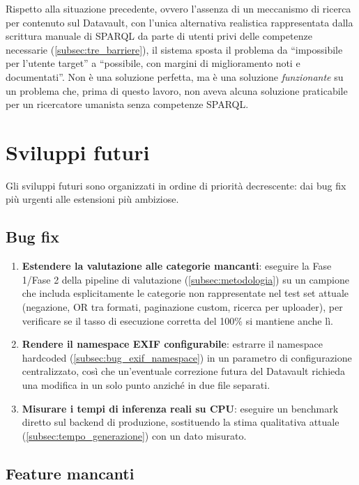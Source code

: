 \documentclass[12pt,a4paper,oneside]{book}
\begin{document}
Rispetto alla situazione precedente, ovvero l'assenza di un meccanismo di ricerca per contenuto sul Datavault, con l'unica alternativa realistica rappresentata dalla scrittura manuale di SPARQL da parte di utenti privi delle competenze necessarie (\cref{subsec:tre_barriere}), il sistema sposta il problema da ``impossibile per l'utente target'' a ``possibile, con margini di miglioramento noti e documentati''. Non è una soluzione perfetta, ma è una soluzione \emph{funzionante} su un problema che, prima di questo lavoro, non aveva alcuna soluzione praticabile per un ricercatore umanista senza competenze SPARQL.\@



\section{Sviluppi futuri}\label{sec:sviluppi_futuri}


Gli sviluppi futuri sono organizzati in ordine di priorità decrescente: dai bug fix più urgenti alle estensioni più ambiziose.

\subsection{Bug fix}\label{subsec:bugfix}

\begin{enumerate}
    \item \textbf{Estendere la valutazione alle categorie mancanti}: eseguire la Fase 1/Fase 2 della pipeline di valutazione (\cref{subsec:metodologia}) su un campione che includa esplicitamente le categorie non rappresentate nel test set attuale (negazione, OR tra formati, paginazione custom, ricerca per uploader), per verificare se il tasso di esecuzione corretta del 100\% si mantiene anche lì.
    \item \textbf{Rendere il namespace EXIF configurabile}: estrarre il namespace hardcoded (\cref{subsec:bug_exif_namespace}) in un parametro di configurazione centralizzato, così che un'eventuale correzione futura del Datavault richieda una modifica in un solo punto anziché in due file separati.
    \item \textbf{Misurare i tempi di inferenza reali su CPU}: eseguire un benchmark diretto sul backend di produzione, sostituendo la stima qualitativa attuale (\cref{subsec:tempo_generazione}) con un dato misurato.
\end{enumerate}

\subsection{Feature mancanti}\label{subsec:feature_mancanti}
\end{document}
